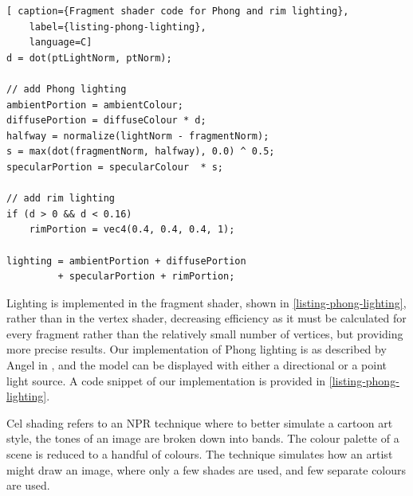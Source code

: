 \begin{lstlisting}[ caption={Fragment shader code for Phong and rim lighting},
    label={listing-phong-lighting}, 
    language=C]
d = dot(ptLightNorm, ptNorm);

// add Phong lighting
ambientPortion = ambientColour;
diffusePortion = diffuseColour * d;
halfway = normalize(lightNorm - fragmentNorm);
s = max(dot(fragmentNorm, halfway), 0.0) ^ 0.5;
specularPortion = specularColour  * s;

// add rim lighting
if (d > 0 && d < 0.16)
	rimPortion = vec4(0.4, 0.4, 0.4, 1);

lighting = ambientPortion + diffusePortion
		 + specularPortion + rimPortion;
\end{lstlisting}

Lighting is implemented in the fragment shader, shown in \autoref{listing-phong-lighting}, rather than in the vertex shader, decreasing 
efficiency as it must be calculated for every fragment rather than the relatively small number of 
vertices, but providing more precise results. Our implementation of Phong lighting is as described 
by Angel in \cite{texbook}, and the model can be displayed with either a directional or a point light 
source. A code snippet of our implementation is provided in \autoref{listing-phong-lighting}.

\newpage 
Cel shading refers to an NPR technique where to better simulate a cartoon art style, the tones of 
an image are broken down into bands. The colour palette of a scene is reduced to a handful of colours.
The technique simulates how an artist might draw an image, where only a few shades are used, and few
separate colours are used.

